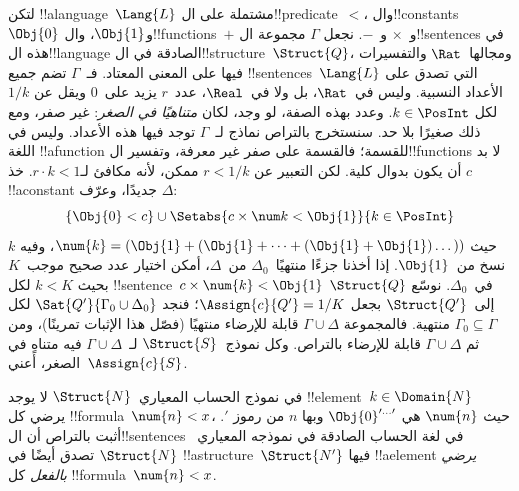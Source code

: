 \documentclass[../../../include/open-logic-section]{subfiles}
\begin{document}
{\begin{ex}
لتكن !!a{language}~$\Lang{L}$ مشتملة على ال!!{predicate}~$<$،
وال!!{constant}s $\Obj{0}$ و$\Obj{1}$، وال!!{function}s~$+$ و~$\times$
و~$-$. نجعل $\Gamma$ مجموعة ال!!{sentence}s في هذه ال!!{language}
الصادقة في ال!!{structure}~$\Struct{Q}$، ومجالها~$\Rat$ والتفسيرات
فيها على المعنى المعتاد. فـ~$\Gamma$ تضم جميع
!!{sentence}s~$\Lang{L}$ التي تصدق على الأعداد النسبية. وليس
في~$\Rat$، بل ولا في~$\Real$، عدد~$r$ يزيد على~$0$ ويقل عن
$1/k$ لكل $k \in \PosInt$. وعدد بهذه الصفة، لو وجد، لكان
\emph{متناهيًا في الصغر}: غير صفر، ومع ذلك صغيرًا بلا حد.
سنستخرج بالتراص نماذج لـ~$\Gamma$ توجد فيها هذه الأعداد.
وليس في اللغة !!a{function} للقسمة؛ فالقسمة على صفر غير معرفة،
وتفسير ال!!{function}s لا بد أن يكون بدوال كلية. لكن التعبير عن
$r < 1/k$ ممكن، لأنه مكافئ لـ$r \cdot k < 1$. خذ $c$
!!a{constant} جديدًا، وعرّف $\Delta$:
\[
\{\Obj{0} < c\}
\cup \Setabs{ c \times \num k < \Obj{1} }{k \in \PosInt}
\]
حيث $\num{k} = (\Obj{1} + (\Obj{1} + \dots + (\Obj{1} +
\Obj{1})\dots))$، وفيه $k$ نسخ من~$\Obj{1}$. إذا أخذنا جزءًا
منتهيًا~$\Delta_0$ من~$\Delta$، أمكن اختيار عدد صحيح موجب~$K$
بحيث $k < K$ لكل !!{sentence}~$c \times \num{k} < \Obj{1}$
في~$\Delta_0$. نوسّع $\Struct{Q}$ إلى~$\Struct{Q'}$ بجعل
$\Assign{c}{Q'} = 1/K$؛ فنجد $\Sat{Q'}{\Gamma_0 \cup \Delta_0}$
لكل $\Gamma_0 \subseteq \Gamma$ منتهية. فالمجموعة $\Gamma \cup \Delta$
قابلة للإرضاء منتهيًا (فصّل هذا الإثبات تمرينًا)، ومن ثم
$\Gamma \cup \Delta$ قابلة للإرضاء بالتراص. وكل نموذج~$\Struct{S}$
لـ~$\Gamma \cup \Delta$ فيه متناهٍ في الصغر، أعني~$\Assign{c}{S}$.
\end{ex}
}{}

\begin{prob}
في نموذج الحساب المعياري~$\Struct{N}$ لا يوجد !!{element}~$k \in
\Domain{N}$ يرضي كل !!{formula}~$\num{n} < x$، حيث
$\num{n}$ هي $\Obj{0}^{\prime\dots\prime}$ وبها $n$ من رموز
$\prime$. أثبت بالتراص أن ال!!{sentence}s في لغة الحساب الصادقة في
نموذجه المعياري~$\Struct{N}$ تصدق أيضًا في
!!a{structure}~$\Struct{N'}$ فيها !!a{element} \emph{يرضي بالفعل}
كل !!{formula}~$\num{n} < x$.
\end{prob}
\tagendprob
\end{document}
